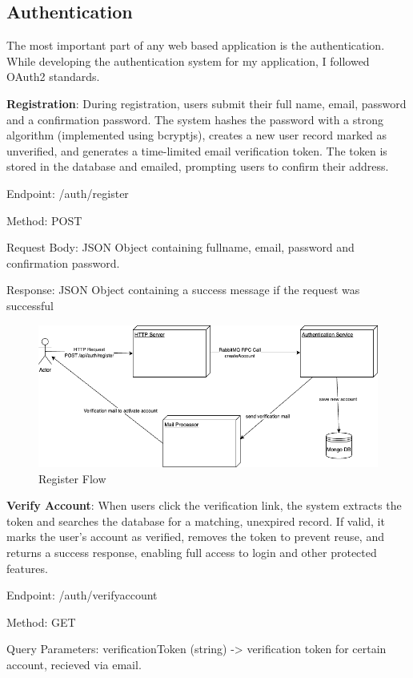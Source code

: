 \subsection{Authentication}
The most important part of any web based application is the authentication. While developing the authentication system for my application, I followed OAuth2 standards. 

\textbf{Registration}: During registration, users submit their full name, email, password and a confirmation password. The system hashes the password with a strong algorithm (implemented using bcryptjs), creates a new user record marked as unverified, and generates a time-limited email verification token. The token is stored in the database and emailed, prompting users to confirm their address.

Endpoint: /auth/register

Method: POST

Request Body: JSON Object containing fullname, email, password and confirmation password.

Response: JSON Object containing a success message if the request was successful

\begin{figure}[H]
  \centering
  \includegraphics[width=1\linewidth]{licenta-register.drawio.png}
  \caption*{Register Flow}
  \label{fig:register-flow}
\end{figure}

\textbf{Verify Account}: When users click the verification link, the system extracts the token and searches the database for a matching, unexpired record. If valid, it marks the user’s account as verified, removes the token to prevent reuse, and returns a success response, enabling full access to login and other protected features.

Endpoint: /auth/verifyaccount

Method: GET

Query Parameters: verificationToken (string) -> verification token for certain account, recieved via email.

